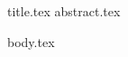 \documentclass[11pt]{llncs}
\begin{document}
{title.tex}
{abstract.tex}

\thispagestyle{plain}

{body.tex}



\end{document}

